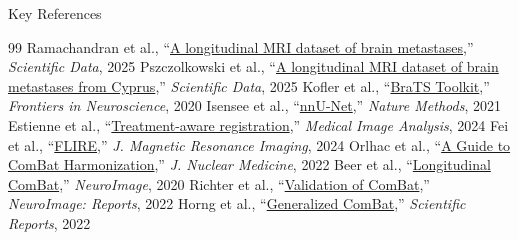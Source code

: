 \documentclass[aspectratio=169,xcolor=dvipsnames]{beamer}
\begin{document}
\begin{frame}[allowframebreaks]{Key References}
    \scriptsize
    \begin{thebibliography}{99}
         Ramachandran et al., ``\href{https://doi.org/10.1038/s41597-025-04360-7}{A longitudinal MRI dataset of brain metastases},'' \textit{Scientific Data}, 2025
         Pszczolkowski et al., ``\href{https://doi.org/10.1038/s41597-025-04608-2}{A longitudinal MRI dataset of brain metastases from Cyprus},'' \textit{Scientific Data}, 2025
         Kofler et al., ``\href{https://doi.org/10.3389/fnins.2020.00125}{BraTS Toolkit},'' \textit{Frontiers in Neuroscience}, 2020
         Isensee et al., ``\href{https://doi.org/10.1038/s41592-020-01008-z}{nnU-Net},'' \textit{Nature Methods}, 2021
         Estienne et al., ``\href{https://doi.org/10.1016/j.media.2024.103148}{Treatment-aware registration},'' \textit{Medical Image Analysis}, 2024
         Fei et al., ``\href{https://doi.org/10.1002/jmri.29474}{FLIRE},'' \textit{J. Magnetic Resonance Imaging}, 2024
         Orlhac et al., ``\href{https://doi.org/10.2967/jnumed.121.262464}{A Guide to ComBat Harmonization},'' \textit{J. Nuclear Medicine}, 2022
         Beer et al., ``\href{https://doi.org/10.1016/j.neuroimage.2020.117129}{Longitudinal ComBat},'' \textit{NeuroImage}, 2020
         Richter et al., ``\href{https://doi.org/10.1016/j.ynirp.2022.100136}{Validation of ComBat},'' \textit{NeuroImage: Reports}, 2022
         Horng et al., ``\href{https://doi.org/10.1038/s41598-022-08412-9}{Generalized ComBat},'' \textit{Scientific Reports}, 2022
    \end{thebibliography}
\end{frame}
\end{document}
